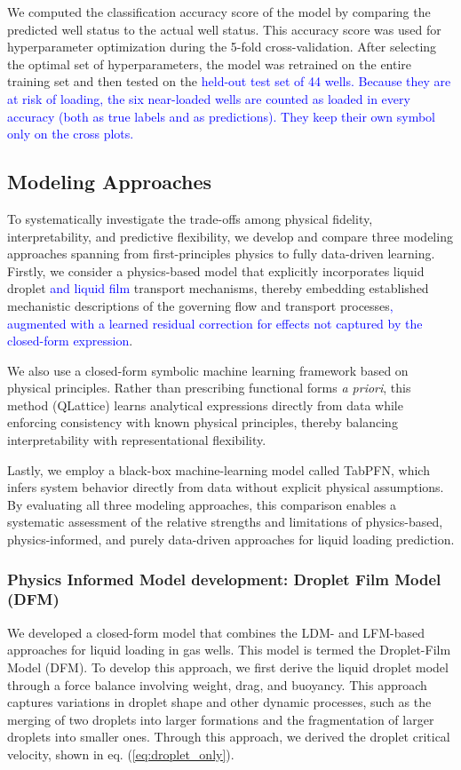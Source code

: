 \documentclass[journal=jacsat,manuscript=article]{achemso}
\newcommand{\al}{\textcolor{blue}}
\theoremstyle{thmstyleone}%
\theoremstyle{thmstyletwo}%
\theoremstyle{thmstylethree}%
\begin{document}
We computed the classification accuracy score of the model by comparing the predicted well status to the actual well status. This accuracy score was used for hyperparameter optimization during the 5-fold cross-validation. After selecting the optimal set of hyperparameters, the model was retrained on the entire training set and then tested on the \al{held-out test set of 44 wells. Because they are at risk of loading, the six near-loaded wells are counted as loaded in every accuracy (both as true labels and as predictions). They keep their own symbol only on the cross plots.}

\subsection{Modeling Approaches}
To systematically investigate the trade-offs among physical fidelity, interpretability, and predictive flexibility, we develop and compare three modeling approaches spanning from first-principles physics to fully data-driven learning. Firstly, we consider a physics-based model that explicitly incorporates liquid droplet \al{and liquid film} transport mechanisms, thereby embedding established mechanistic descriptions of the governing flow and transport processes\al{, augmented with a learned residual correction for effects not captured by the closed-form expression}. 

We also use a closed-form symbolic machine learning framework based on physical principles. Rather than prescribing functional forms \textit{a priori}, this method (QLattice) learns analytical expressions directly from data while enforcing consistency with known physical principles, thereby balancing interpretability with representational flexibility.\cite{Christensen2022QLattice} 

Lastly, we employ a black-box machine-learning model called TabPFN, which infers system behavior directly from data without explicit physical assumptions.\cite{kaplan2020scaling} By evaluating all three modeling approaches, this comparison enables a systematic assessment of the relative strengths and limitations of physics-based, physics-informed, and purely data-driven approaches for liquid loading prediction.

\subsubsection{Physics Informed Model development: Droplet Film Model (DFM)}
We developed a closed-form model that combines the LDM- and LFM-based approaches for liquid loading in gas wells. This model is termed the Droplet-Film Model (DFM). To develop this approach, we first derive the liquid droplet model through a force balance involving weight, drag, and buoyancy. This approach captures variations in droplet shape and other dynamic processes, such as the merging of two droplets into larger formations and the fragmentation of larger droplets into smaller ones. Through this approach, we derived the droplet critical velocity, shown in eq. (\ref{eq:droplet_only}). 
\end{document}
